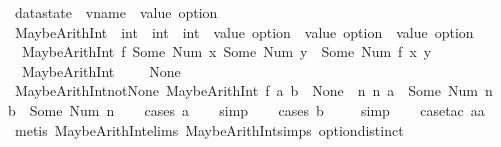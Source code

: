\begin{isabellebody}
\isamarkupfalse%
\ datastate\ {\isacharequal}\ {\isachardoublequoteopen}vname\ {\isasymRightarrow}\ value\ option{\isachardoublequoteclose}%
\isamarkupfalse%
\ MaybeArithInt\ {\isacharcolon}{\isacharcolon}\ {\isachardoublequoteopen}{\isacharparenleft}int\ {\isasymRightarrow}\ int\ {\isasymRightarrow}\ int{\isacharparenright}\ {\isasymRightarrow}\ value\ option\ {\isasymRightarrow}\ value\ option\ {\isasymRightarrow}\ value\ option{\isachardoublequoteclose}\ \isanewline
\ \ {\isachardoublequoteopen}MaybeArithInt\ f\ {\isacharparenleft}Some\ {\isacharparenleft}Num\ x{\isacharparenright}{\isacharparenright}\ {\isacharparenleft}Some\ {\isacharparenleft}Num\ y{\isacharparenright}{\isacharparenright}\ {\isacharequal}\ Some\ {\isacharparenleft}Num\ {\isacharparenleft}f\ x\ y{\isacharparenright}{\isacharparenright}{\isachardoublequoteclose}\ {\isacharbar}\isanewline
\ \ {\isachardoublequoteopen}MaybeArithInt\ {\isacharunderscore}\ {\isacharunderscore}\ {\isacharunderscore}\ {\isacharequal}\ None{\isachardoublequoteclose}\isanewline
\isanewline
{}\isamarkupfalse%
\ MaybeArithInt{\isacharunderscore}not{\isacharunderscore}None{\isacharcolon}\ {\isachardoublequoteopen}MaybeArithInt\ f\ a\ b\ {\isasymnoteq}\ None\ {\isacharequal}\ {\isacharparenleft}{\isasymexists}n\ n{\isacharprime}{\isachardot}\ a\ {\isacharequal}\ Some\ {\isacharparenleft}Num\ n{\isacharparenright}\ {\isasymand}\ b\ {\isacharequal}\ Some\ {\isacharparenleft}Num\ n{\isacharprime}{\isacharparenright}{\isacharparenright}{\isachardoublequoteclose}\isanewline
%
\isadelimproof
\ \ %
\endisadelimproof
%
\isatagproof
{}\isamarkupfalse%
\ {\isacharparenleft}cases\ a{\isacharparenright}\isanewline
\ \ \isamarkupfalse%
\ simp\isanewline
\ \ \isamarkupfalse%
\ {\isacharparenleft}cases\ b{\isacharparenright}\isanewline
\ \ \ \isamarkupfalse%
\ simp\isanewline
\ \ \isamarkupfalse%
\ {\isacharparenleft}case{\isacharunderscore}tac\ aa{\isacharparenright}\isanewline
\ \ \ \isamarkupfalse%
\ {\isacharparenleft}metis\ MaybeArithInt{\isachardot}elims\ MaybeArithInt{\isachardot}simps{\isacharparenleft}{}{\isacharparenright}\ option{\isachardot}distinct{\isacharparenleft}{}{\isacharparenright}{\isacharparenright}\isanewline

\end{isabellebody}
